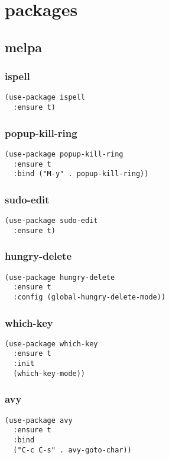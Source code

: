 \documentclass[11pt]{article}
\author{big}
\date{\today}
\title{}
\begin{document}
\tableofcontents

\section{packages}
\label{sec:orga1dfecf}
\subsection{melpa}
\label{sec:org48b6255}
\subsubsection{ispell}
\label{sec:orgffb9ff3}
\begin{verbatim}
(use-package ispell
  :ensure t)
\end{verbatim}
\subsubsection{popup-kill-ring}
\label{sec:org31fc857}
\begin{verbatim}
(use-package popup-kill-ring
  :ensure t
  :bind ("M-y" . popup-kill-ring))
\end{verbatim}
\subsubsection{sudo-edit}
\label{sec:orgfb7ea78}
\begin{verbatim}
(use-package sudo-edit
  :ensure t)
\end{verbatim}
\subsubsection{hungry-delete}
\label{sec:orgc87483c}
\begin{verbatim}
(use-package hungry-delete
  :ensure t
  :config (global-hungry-delete-mode))
\end{verbatim}
\subsubsection{which-key}
\label{sec:orga445ef0}
\begin{verbatim}
(use-package which-key
  :ensure t
  :init
  (which-key-mode))
\end{verbatim}
\subsubsection{avy}
\label{sec:org10a4d49}
\begin{verbatim}
(use-package avy
  :ensure t
  :bind
  ("C-c C-s" . avy-goto-char))
\end{verbatim}
\end{document}
